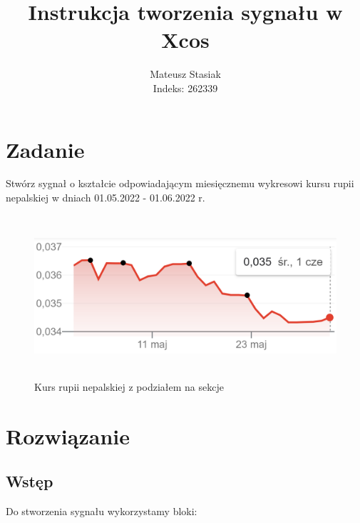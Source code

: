 \documentclass[12pt]{mwart}
\author{Mateusz Stasiak \\ Indeks: 262339}
\title{Instrukcja tworzenia sygnału w Xcos}
\begin{document}
	\maketitle
	
	\section{Zadanie}
	\noindent Stwórz sygnał o kształcie odpowiadającym miesięcznemu wykresowi kursu rupii nepalskiej w dniach 01.05.2022 - 01.06.2022 r. 
	
	\begin{figure}[H]
	\begin{center}
		\includegraphics[height=6cm, width=\linewidth]{kurs rupii nepalskiej.png}
		\caption{Kurs rupii nepalskiej z podziałem na sekcje} \label{kurs}
	\end{center}
	\end{figure}
	
	
	
	\section{Rozwiązanie}
	\subsection{Wstęp}
	\noindent Do stworzenia sygnału wykorzystamy bloki:
	
\end{document}
